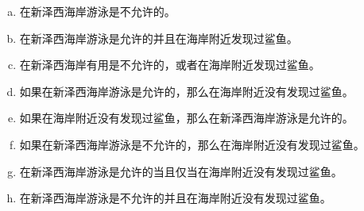 {{        \begin{practices}
            \begin{enumerate}[a)]
                \item 在新泽西海岸游泳是不允许的。
                \item 在新泽西海岸游泳是允许的并且在海岸附近发现过鲨鱼。
                \item 在新泽西海岸有用是不允许的，或者在海岸附近发现过鲨鱼。
                \item 如果在新泽西海岸游泳是允许的，那么在海岸附近没有发现过鲨鱼。
                \item 如果在海岸附近没有发现过鲨鱼，那么在新泽西海岸游泳是允许的。
                \item 如果在新泽西海岸游泳是不允许的，那么在海岸附近没有发现过鲨鱼。
                \item 在新泽西海岸游泳是允许的当且仅当在海岸附近没有发现过鲨鱼。
                \item 在新泽西海岸游泳是不允许的并且在海岸附近没有发现过鲨鱼。
            \end{enumerate}
        \end{practices}
    }
}
